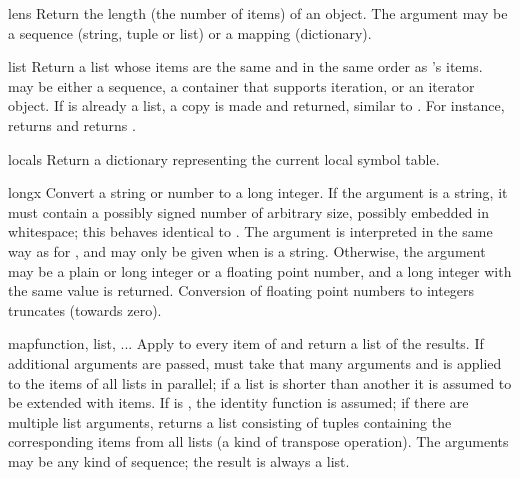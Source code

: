\begin{funcdesc}{len}{s}
  Return the length (the number of items) of an object.  The argument
  may be a sequence (string, tuple or list) or a mapping (dictionary).
\end{funcdesc}

\begin{funcdesc}{list}{}
  Return a list whose items are the same and in the same order as
  's items.   may be either a sequence, a
  container that supports iteration, or an iterator object.  If
   is already a list, a copy is made and returned,
  similar to .  For instance,
   returns \code{['a', 'b', 'c']} and  returns \code{[1, 2, 3]}.
\end{funcdesc}

\begin{funcdesc}{locals}{}
  Return a dictionary representing the current local symbol table.
\end{funcdesc}

\begin{funcdesc}{long}{x}
  Convert a string or number to a long integer.  If the argument is a
  string, it must contain a possibly signed number of
  arbitrary size, possibly embedded in whitespace;
  this behaves identical to .  The
   argument is interpreted in the same way as for
  , and may only be given when  is a string.
  Otherwise, the argument may be a plain or
  long integer or a floating point number, and a long integer with
  the same value is returned.    Conversion of floating
  point numbers to integers truncates (towards zero).
\end{funcdesc}

\begin{funcdesc}{map}{function, list, ...}
  Apply  to every item of  and return a list
  of the results.  If additional  arguments are passed,
   must take that many arguments and is applied to the
  items of all lists in parallel; if a list is shorter than another it
  is assumed to be extended with  items.  If 
  is , the identity function is assumed; if there are
  multiple list arguments,  returns a list consisting
  of tuples containing the corresponding items from all lists (a kind
  of transpose operation).  The  arguments may be any kind
  of sequence; the result is always a list.
\end{funcdesc}

